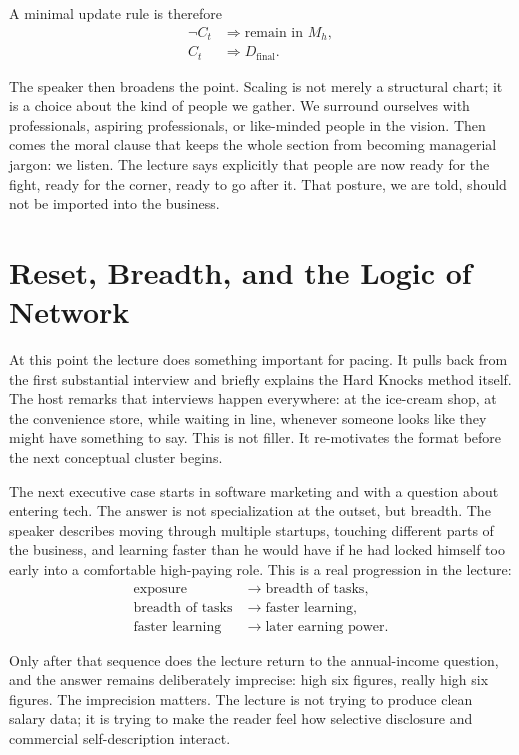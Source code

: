 A minimal update rule is therefore
\begin{align}
\neg C_t &\Rightarrow \text{remain in } M_h,\\
C_t &\Rightarrow D_{\mathrm{final}}.
\end{align}

The speaker then broadens the point. Scaling is not merely a structural chart; it is a choice about the kind of people we gather. We surround ourselves with professionals, aspiring professionals, or like-minded people in the vision. Then comes the moral clause that keeps the whole section from becoming managerial jargon: we listen. The lecture says explicitly that people are now ready for the fight, ready for the corner, ready to go after it. That posture, we are told, should not be imported into the business.

\section{Reset, Breadth, and the Logic of Network}

At this point the lecture does something important for pacing. It pulls back from the first substantial interview and briefly explains the Hard Knocks method itself. The host remarks that interviews happen everywhere: at the ice-cream shop, at the convenience store, while waiting in line, whenever someone looks like they might have something to say. This is not filler. It re-motivates the format before the next conceptual cluster begins.

The next executive case starts in software marketing and with a question about entering tech. The answer is not specialization at the outset, but breadth. The speaker describes moving through multiple startups, touching different parts of the business, and learning faster than he would have if he had locked himself too early into a comfortable high-paying role. This is a real progression in the lecture:
\begin{align}
\text{exposure} &\longrightarrow \text{breadth of tasks},\\
\text{breadth of tasks} &\longrightarrow \text{faster learning},\\
\text{faster learning} &\longrightarrow \text{later earning power}.
\end{align}

Only after that sequence does the lecture return to the annual-income question, and the answer remains deliberately imprecise: high six figures, really high six figures. The imprecision matters. The lecture is not trying to produce clean salary data; it is trying to make the reader feel how selective disclosure and commercial self-description interact.

